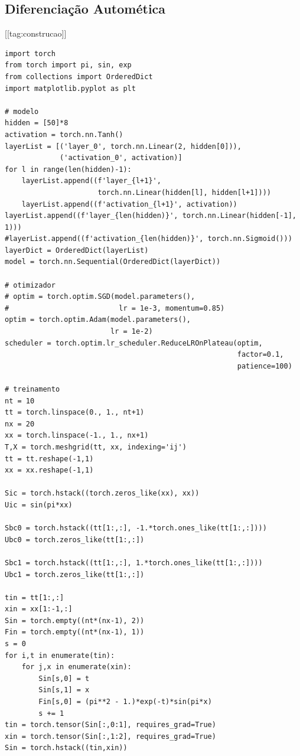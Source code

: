 \subsection{Diferenciação Automética}
[[tag:construcao]]

\begin{lstlisting}[caption=mlp\_calor\_autograd.py]
import torch
from torch import pi, sin, exp
from collections import OrderedDict
import matplotlib.pyplot as plt

# modelo
hidden = [50]*8
activation = torch.nn.Tanh()
layerList = [('layer_0', torch.nn.Linear(2, hidden[0])),
             ('activation_0', activation)]
for l in range(len(hidden)-1):
    layerList.append((f'layer_{l+1}',
                      torch.nn.Linear(hidden[l], hidden[l+1])))
    layerList.append((f'activation_{l+1}', activation))
layerList.append((f'layer_{len(hidden)}', torch.nn.Linear(hidden[-1], 1)))
#layerList.append((f'activation_{len(hidden)}', torch.nn.Sigmoid()))
layerDict = OrderedDict(layerList)
model = torch.nn.Sequential(OrderedDict(layerDict))

# otimizador
# optim = torch.optim.SGD(model.parameters(),
#                          lr = 1e-3, momentum=0.85)
optim = torch.optim.Adam(model.parameters(),
                         lr = 1e-2)
scheduler = torch.optim.lr_scheduler.ReduceLROnPlateau(optim,
                                                       factor=0.1,
                                                       patience=100)

# treinamento
nt = 10
tt = torch.linspace(0., 1., nt+1)
nx = 20
xx = torch.linspace(-1., 1., nx+1)
T,X = torch.meshgrid(tt, xx, indexing='ij')
tt = tt.reshape(-1,1)
xx = xx.reshape(-1,1)

Sic = torch.hstack((torch.zeros_like(xx), xx))
Uic = sin(pi*xx)

Sbc0 = torch.hstack((tt[1:,:], -1.*torch.ones_like(tt[1:,:])))
Ubc0 = torch.zeros_like(tt[1:,:])

Sbc1 = torch.hstack((tt[1:,:], 1.*torch.ones_like(tt[1:,:])))
Ubc1 = torch.zeros_like(tt[1:,:])

tin = tt[1:,:]
xin = xx[1:-1,:]
Sin = torch.empty((nt*(nx-1), 2))
Fin = torch.empty((nt*(nx-1), 1))
s = 0
for i,t in enumerate(tin):
    for j,x in enumerate(xin):
        Sin[s,0] = t
        Sin[s,1] = x
        Fin[s,0] = (pi**2 - 1.)*exp(-t)*sin(pi*x)
        s += 1
tin = torch.tensor(Sin[:,0:1], requires_grad=True)
xin = torch.tensor(Sin[:,1:2], requires_grad=True)
Sin = torch.hstack((tin,xin))


\end{lstlisting}
